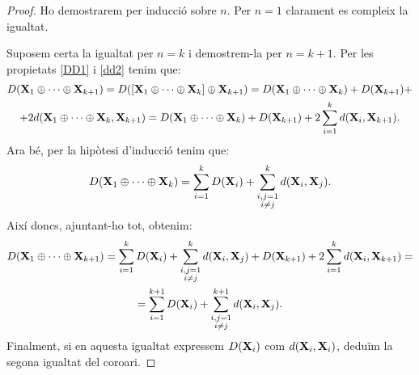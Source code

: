 \documentclass{article}
\theoremstyle{math}
\theoremstyle{TheoremNum}
\newcommand{\0}{\ensuremath{\vb{0}}}
\newcommand{\X}{\ensuremath{\vb{X}}}
\begin{document}
\begin{proof}
    Ho demostrarem per inducció sobre $n$. Per $n=1$ clarament es compleix la igualtat.\par 
    \noindent Suposem certa la igualtat per $n=k$ i demostrem-la per $n=k+1$. Per les propietats \ref{DD1} i \ref{dd2} tenim que:
    \begin{multline*}
        D(\X_1\oplus\cdots\oplus\X_{k+1})=D([\X_1\oplus\cdots\oplus\X_k]\oplus\X_{k+1})=D(\X_1\oplus\cdots\oplus\X_k)+D(\X_{k+1})+\\+2d(\X_1\oplus\cdots\oplus\X_k,\X_{k+1})=D(\X_1\oplus\cdots\oplus\X_k)+D(\X_{k+1})+2\sum_{i=1}^kd(\X_i,\X_{k+1}).
    \end{multline*}
    Ara bé, per la hipòtesi d'inducció tenim que:
    $$D(\X_1\oplus\cdots\oplus\X_k)=\sum_{i=1}^kD(\X_i)+\sum_{\substack{i,j=1\\i\ne j}}^kd(\X_i,\X_j).$$
    Així doncs, ajuntant-ho tot, obtenim:
    \begin{multline*}
        D(\X_1\oplus\cdots\oplus\X_{k+1})=\sum_{i=1}^kD(\X_i)+\sum_{\substack{i,j=1\\i\ne j}}^kd(\X_i,\X_j)+D(\X_{k+1})+2\sum_{i=1}^kd(\X_i,\X_{k+1})=\\=\sum_{i=1}^{k+1}D(\X_i)+\sum_{\substack{i,j=1\\i\ne j}}^{k+1}d(\X_i,\X_j).
    \end{multline*}
    Finalment, si en aquesta igualtat expressem $D(\X_i)$ com $d(\X_i,\X_i)$, deduïm la segona igualtat del coro\lgem ari.
\end{proof}
\end{document}
